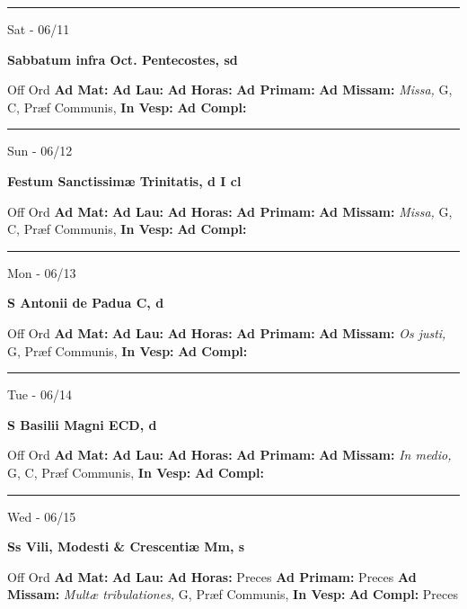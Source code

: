 \documentclass[letterpaper, 10pt]{article}
\begin{document}
\hrule
\begin{center}
Sat - 06/11
\end{center}\textbf{ \large Sabbatum infra Oct. Pentecostes, \textnormal{\normalsize sd}}
\begin{justify}
Off Ord
\textbf{Ad Mat: }
\textbf{Ad Lau: }
\textbf{Ad Horas: }
\textbf{Ad Primam: }
\textbf{Ad Missam:} \textit{Missa, } G, C, Præf Communis, 
\textbf{In Vesp: }
\textbf{Ad Compl: }\end{justify}



\hrule
\begin{center}
Sun - 06/12
\end{center}\textbf{ \large Festum Sanctissimæ Trinitatis, \textnormal{\normalsize d I cl}}
\begin{justify}
Off Ord
\textbf{Ad Mat: }
\textbf{Ad Lau: }
\textbf{Ad Horas: }
\textbf{Ad Primam: }
\textbf{Ad Missam:} \textit{Missa, } G, C, Præf Communis, 
\textbf{In Vesp: }
\textbf{Ad Compl: }\end{justify}



\hrule
\begin{center}
Mon - 06/13
\end{center}\textbf{ \large S Antonii de Padua C, \textnormal{\normalsize d}}
\begin{justify}
Off Ord
\textbf{Ad Mat: }
\textbf{Ad Lau: }
\textbf{Ad Horas: }
\textbf{Ad Primam: }
\textbf{Ad Missam:} \textit{Os justi, } G, Præf Communis, 
\textbf{In Vesp: }
\textbf{Ad Compl: }\end{justify}



\hrule
\begin{center}
Tue - 06/14
\end{center}\textbf{ \large S Basilii Magni ECD, \textnormal{\normalsize d}}
\begin{justify}
Off Ord
\textbf{Ad Mat: }
\textbf{Ad Lau: }
\textbf{Ad Horas: }
\textbf{Ad Primam: }
\textbf{Ad Missam:} \textit{In medio, } G, C, Præf Communis, 
\textbf{In Vesp: }
\textbf{Ad Compl: }\end{justify}



\hrule
\begin{center}
Wed - 06/15
\end{center}\textbf{ \large Ss Vili, Modesti \& Crescentiæ Mm, \textnormal{\normalsize s}}
\begin{justify}
Off Ord
\textbf{Ad Mat: }
\textbf{Ad Lau: }
\textbf{Ad Horas: }Preces
\textbf{Ad Primam: }Preces
\textbf{Ad Missam:} \textit{Multæ tribulationes, } G, Præf Communis, 
\textbf{In Vesp: }
\textbf{Ad Compl: }Preces\end{justify}
\end{document}
